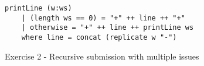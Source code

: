 

\begin{figure}
\begin{verbatim}
printLine (w:ws)
    | (length ws == 0) = "+" ++ line ++ "+"
    | otherwise = "+" ++ line ++ printLine ws
    where line = concat (replicate w "-")
\end{verbatim}
\caption{Exercise 2 - Recursive submission with multiple issues}
\label{fig:ex2-reimplementation-map-guards}
\end{figure}








